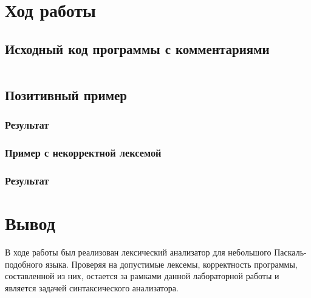 \documentclass[12pt, a4paper]{article}
\begin{document}
\section{Ход работы}

\subsection{Исходный код программы с комментариями}
\inputminted{rust}{main.rs}

\subsection{Позитивный пример}

\subsubsection{Результат}


\subsubsection{Пример с некорректной лексемой}

\subsubsection{Результат}


\section{Вывод}

В ходе работы был реализован лексический анализатор для
небольшого Паскаль-подобного языка. Проверяя на допустимые лексемы,
корректность программы, составленной из них,
остается за рамками данной лабораторной
работы и является задачей синтаксического анализатора.
\end{document}
